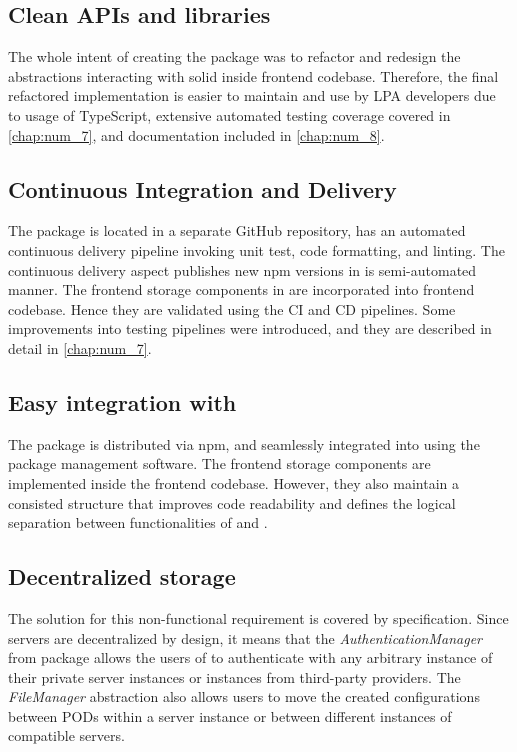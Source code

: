 \subsection{Clean APIs and libraries}

The whole intent of creating the \lpas{} package was to refactor and redesign the abstractions interacting with solid inside \lpa{} frontend codebase. Therefore, the final refactored implementation is easier to maintain and use by LPA developers due to usage of TypeScript, extensive automated testing coverage covered in \autoref{chap:num_7}, and documentation included in \autoref{chap:num_8}.

\subsection{Continuous Integration and Delivery}

The \lpas{} package is located in a separate GitHub repository, has an automated continuous delivery pipeline invoking unit test, code formatting, and linting. The continuous delivery aspect publishes new npm versions in is semi-automated manner. The frontend storage components in \lpa{} are incorporated into frontend codebase. Hence they are validated using the \lpa{} CI and CD pipelines. Some improvements into \lpa{} testing pipelines were introduced, and they are described in detail in \autoref{chap:num_7}.

\subsection{Easy integration with \lpa{}}

The \lpas{} package is distributed via npm, and seamlessly integrated into \lpa{} using the package management software. The frontend storage components are implemented inside the frontend codebase. However, they also maintain a consisted structure that improves code readability and defines the logical separation between functionalities of \lpa{} and \lpas{}.

\subsection{Decentralized storage}

The solution for this non-functional requirement is covered by \solid{} specification. Since \solid{} servers are decentralized by design, it means that the \textit{AuthenticationManager} from \lpas{} package allows the users of \lpa{} to authenticate with any arbitrary instance of their private \solid{} server instances or instances from third-party \solid{} providers. The \textit{FileManager} abstraction also allows users to move the created \lpa{} configurations between \solid{} PODs within a \solid{} server instance or between different instances of compatible \solid{} servers.